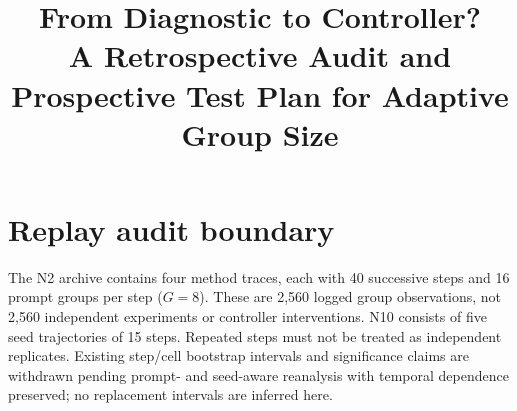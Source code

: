 \documentclass{article}
\title{From Diagnostic to Controller?\\
       A Retrospective Audit and Prospective Test Plan for Adaptive Group Size}
\begin{document}
\sloppy {}  \hfuzz=2pt
\maketitle

\section{Replay audit boundary}
\label{sec:p7-replay-boundary}
The N2 archive contains four method traces, each with 40 successive steps and
16 prompt groups per step ($G=8$). These are 2,560 logged group observations,
not 2,560 independent experiments or controller interventions. N10 consists
of five seed trajectories of 15 steps. Repeated steps must not be treated as
independent replicates. Existing step/cell bootstrap intervals and significance
claims are withdrawn pending prompt- and seed-aware reanalysis with temporal
dependence preserved; no replacement intervals are inferred here.
\end{document}
